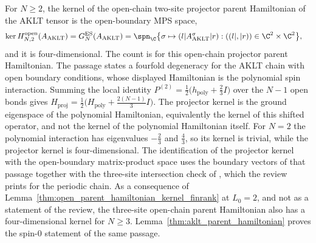 \begin{lemma}
    \label{thm:aklt_open_ground_space}
    \leanok
    For $N\ge2$, the kernel of the open-chain two-site projector parent
    Hamiltonian of the AKLT tensor is the open-boundary MPS space,
    \begin{align}
        \ker H^{\mathrm{open}}_{N,2}(A_{\mathrm{AKLT}})
         & = G_{N}^{\mathrm{ES}}(A_{\mathrm{AKLT}})
        = \spn_{\C}\bigl\{\sigma\mapsto
        (l|A_{\mathrm{AKLT}}^{\sigma}|r) :
        ((l|,|r))\in\C^{2}\times\C^{2}\bigr\},
        \notag
    \end{align}
    and it is four-dimensional. The count is for this open-chain projector
    parent Hamiltonian. The passage
    \cite[lines~1171--1174]{Cirac2021Matrix} states a fourfold degeneracy for
    the AKLT chain with open boundary conditions, whose displayed Hamiltonian
    is the polynomial spin interaction. Summing the local identity
    $P^{(2)}=\frac12\bigl(h_{\mathrm{poly}}+\frac23 I\bigr)$ over the
    $N-1$ open bonds gives
    $H_{\mathrm{proj}}=\frac12\bigl(H_{\mathrm{poly}}+\frac{2(N-1)}{3}I\bigr)$.
    The projector kernel is the ground eigenspace of the polynomial
    Hamiltonian, equivalently the kernel of this shifted operator, and not
    the kernel of the polynomial Hamiltonian itself. For $N=2$ the
    polynomial interaction has eigenvalues $-\frac23$ and $\frac43$, so its
    kernel is trivial, while the projector kernel is four-dimensional. The identification of the projector kernel with the
    open-boundary matrix-product space uses the boundary vectors of that
    passage together with the three-site intersection check of
    \cite[line~2095]{Cirac2021Matrix}, which the review prints for the
    periodic chain. As a consequence of
    Lemma~\ref{thm:open_parent_hamiltonian_kernel_finrank} at $L_{0}=2$,
    and not as a statement of the review, the three-site open-chain parent
    Hamiltonian also has a four-dimensional kernel for $N\ge3$.
    Lemma~\ref{thm:aklt_parent_hamiltonian} proves the spin-$0$ statement of
    the same passage.
\end{lemma}

